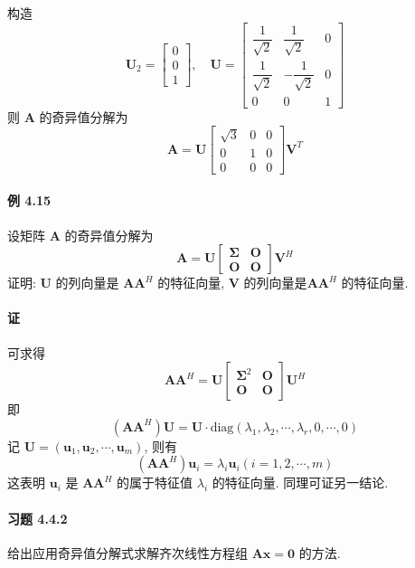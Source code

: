 \documentclass[12pt, a4paper, oneside, fontset=none]{ctexart}
\begin{document}
构造
$$
    \bm{U}_2 = \begin{bmatrix}
        0 \\
        0 \\
        1
    \end{bmatrix}, \quad
    \bm{U} = \begin{bmatrix}
        \dfrac{1}{\sqrt{2}} & \dfrac{1}{\sqrt{2}}  & 0 \\
        \dfrac{1}{\sqrt{2}} & -\dfrac{1}{\sqrt{2}} & 0 \\
        0                   & 0                    & 1
    \end{bmatrix}
$$
则 $\bm{A}$ 的奇异值分解为
$$
    \bm{A} = \bm{U}\begin{bmatrix}
        \sqrt{3} & 0 & 0 \\
        0        & 1 & 0 \\
        0        & 0 & 0
    \end{bmatrix}\bm{V}^T
$$

\paragraph*{例 4.15} 设矩阵 $\bm{A}$ 的奇异值分解为
$$
    \bm{A} = \bm{U}\begin{bmatrix}
        \bm{\Sigma} & \bm{O} \\
        \bm{O}      & \bm{O}
    \end{bmatrix}\bm{V}^H
$$
证明: $\bm{U}$ 的列向量是 $\bm{AA}^H$ 的特征向量, $\bm{V}$ 的列向量是$\bm{AA}^H$ 的特征向量.

\paragraph*{证} 可求得
$$
    \bm{AA}^H = \bm{U}\begin{bmatrix}
        \bm{\Sigma}^2 & \bm{O} \\
        \bm{O}        & \bm{O}
    \end{bmatrix}\bm{U}^H
$$
即
$$
    (\bm{AA}^H)\bm{U} = \bm{U} \cdot \mathrm{diag}(\lambda_1, \lambda_2, \cdots, \lambda_r, 0, \cdots, 0)
$$
记 $\bm{U} = (\bm{u}_1, \bm{u}_2, \cdots, \bm{u}_m)$, 则有
$$
    (\bm{AA}^H)\bm{u}_i = \lambda_i\bm{u}_i (i = 1,2,\cdots,m)
$$
这表明 $\bm{u}_i$ 是 $\bm{AA}^H$ 的属于特征值 $\lambda_i$ 的特征向量. 同理可证另一结论.

\paragraph*{习题 4.4.2} 给出应用奇异值分解式求解齐次线性方程组 $\bm{Ax} = \bm{0}$ 的方法.
\end{document}
